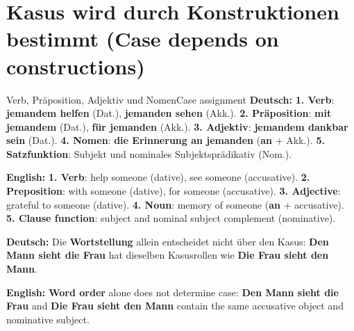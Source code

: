 \documentclass[a4paper,11pt]{article}
\newcommand{\GermanText}[1]{\textbf{Deutsch: }#1\par}
\newcommand{\EnglishText}[1]{{\small\color{SoftGray}\textbf{English: }#1\par}}
\begin{document}
    \section{Kasus wird durch Konstruktionen bestimmt \textnormal{(Case depends on constructions)}}
        \begin{grammarentry}{Verb, Präposition, Adjektiv und Nomen}{Case assignment}
            \GermanText{\textbf{1. Verb}: \textbf{jemandem helfen} (Dat.), \textbf{jemanden sehen} (Akk.). \textbf{2. Präposition}: \textbf{mit jemandem} (Dat.), \textbf{für jemanden} (Akk.). \textbf{3. Adjektiv}: \textbf{jemandem dankbar sein} (Dat.). \textbf{4. Nomen}: \textbf{die Erinnerung an jemanden} (\textbf{an} + Akk.). \textbf{5. Satzfunktion}: Subjekt und nominales Subjektsprädikativ (Nom.).}
            \EnglishText{\textbf{1. Verb}: help someone (dative), see someone (accusative). \textbf{2. Preposition}: with someone (dative), for someone (accusative). \textbf{3. Adjective}: grateful to someone (dative). \textbf{4. Noun}: memory of someone (\textbf{an} + accusative). \textbf{5. Clause function}: subject and nominal subject complement (nominative).}
            \GermanText{Die \textbf{Wortstellung} allein entscheidet nicht über den Kasus: \textbf{Den Mann sieht die Frau} hat dieselben Kasusrollen wie \textbf{Die Frau sieht den Mann}.}
            \EnglishText{\textbf{Word order} alone does not determine case: \textbf{Den Mann sieht die Frau} and \textbf{Die Frau sieht den Mann} contain the same accusative object and nominative subject.}
        \end{grammarentry}


    
    
\end{document}
